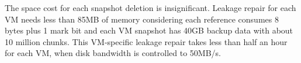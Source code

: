 The space cost for each snapshot deletion is insignificant.
Leakage repair for each VM needs less than 85MB of memory
considering each reference consumes 8 bytes plus  1 mark bit and  
each VM snapshot has 40GB backup data with about 10 million chunks. 
This VM-specific leakage  repair takes  less than half an hour for each VM, 
when disk bandwidth is controlled to 50MB/s. 




